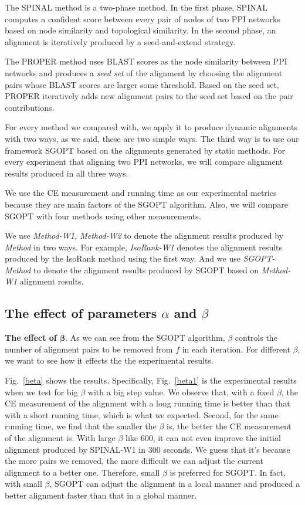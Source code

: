 \documentclass{bioinfo}
\theoremstyle{definition}
\begin{document}
The SPINAL\citep{aladaug2013spinal} method is a two-phase method. In the first phase, SPINAL computes a confident score between every pair of nodes of two PPI networks based on node similarity and topological similarity. In the second phase, an alignment is iteratively produced by a seed-and-extend strategy.

The PROPER\citep{kazemi2016proper} method uses BLAST scores as the node similarity between PPI networks and produces a \textit{seed set} of the alignment by choosing the alignment pairs whose BLAST scores are larger some threshold. Based on the seed set, PROPER iteratively adds new alignment pairs to the seed set based on the pair contributions.

For every method we compared with, we apply it to produce dynamic alignments with two ways, as we said, these are two simple ways. The third way is to use our framework SGOPT based on the alignments generated by static methods. For every experiment that aligning two PPI networks, we will compare alignment results produced in all three ways.

We use the CE measurement and running time as our experimental metrics because they are main factors of the SGOPT algorithm. Also, we will compare SGOPT with four methods using other measurements.

We use \textit{Method-W1, Method-W2} to denote the alignment results produced by \textit{Method} in two ways. For example, \textit{IsoRank-W1} denotes the alignment results produced by the IsoRank method using the first way. And we use \textit{SGOPT-Method} to denote the alignment results produced by SGOPT based on \textit{Method-W1} alignment results.

\subsection{The effect of parameters $\alpha$ and $\beta$}
\textbf{The effect of $\mathbf{\beta}$}. As we can see from the SGOPT algorithm, $\beta$ controls the number of alignment pairs to be removed from $f$ in each iteration. For different $\beta$, we want to see how it effects the the experimental results. 

Fig.~\ref{beta} shows the results. Specifically, Fig.~\ref{beta1} is the experimental results when we test for big $\beta$ with a big step value. We observe that, with a fixed $\beta$, the CE measurement of the alignment with a long running time is better than that with a short running time, which is what we expected. Second, for the same running time, we find that the smaller the $\beta$ is, the better the CE measurement of the alignment is. With large $\beta$ like 600, it can not even improve the initial alignment produced by SPINAL-W1 in 300 seconds. We guess that it's because the more pairs we removed, the more difficult we can adjust the current alignment to a better one. Therefore, small $\beta$ is preferred for SGOPT. In fact, with small $\beta$, SGOPT can adjust the alignment in a local manner and produced a better alignment faster than that in a global manner.
\end{document}
